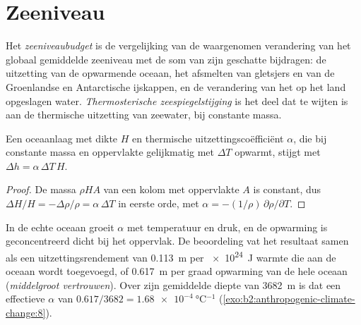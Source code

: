 \section{Zeeniveau}\label{sec:b2:anthropogenic-climate-change:sea-level}

\begin{definition}\label{def:b2:anthropogenic-climate-change:sea-level}
Het \emph{zeeniveaubudget} is de vergelijking van de waargenomen verandering van het
globaal gemiddelde zeeniveau met de som van zijn geschatte bijdragen: de uitzetting van de opwarmende
oceaan, het afsmelten van gletsjers en van de Groenlandse en Antarctische ijskappen, en de verandering van het
op het land opgeslagen water. \emph{Thermosterische zeespiegelstijging} is het
deel dat te wijten is aan de thermische uitzetting van zeewater, bij constante massa.
\end{definition}

\begin{proposition}\label{prop:b2:anthropogenic-climate-change:thermosteric}
Een oceaanlaag met dikte $H$ en thermische uitzettingscoëfficiënt $\alpha$, die bij constante massa en oppervlakte gelijkmatig
met $\Delta T$ opwarmt, stijgt met $\Delta h = \alpha\,\Delta T\,H$.
\end{proposition}
\begin{proof}
De massa $\rho H A$ van een kolom met oppervlakte $A$ is constant, dus $\Delta H/H = -\Delta\rho/\rho =
\alpha\,\Delta T$ in eerste orde, met $\alpha = -(1/\rho)\,\partial\rho/\partial T$.
\end{proof}

In de echte oceaan groeit $\alpha$ met temperatuur en druk, en de opwarming is geconcentreerd dicht bij
het oppervlak. De beoordeling vat het resultaat samen als een uitzettingsrendement van \qty{0.113}{m} per
\qty{e24}{J} warmte die aan de oceaan wordt toegevoegd, of \qty{0.617}{m} per graad opwarming van de hele oceaan
(\emph{middelgroot vertrouwen}). Over zijn gemiddelde diepte van \qty{3682}{m} is dat een effectieve $\alpha$ van
$0.617/3682 = \qty{1.68e-4}{\celsius^{-1}}$ (\cref{exo:b2:anthropogenic-climate-change:8}).


